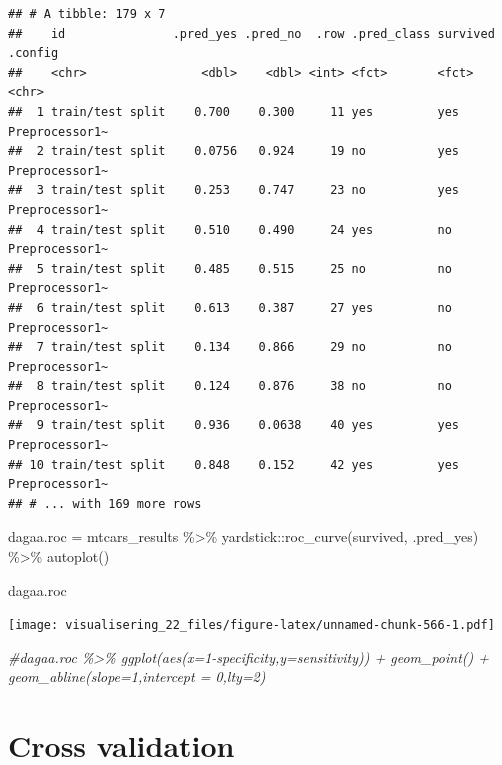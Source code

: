 \documentclass[
]{book}
\newenvironment{Shaded}{\begin{snugshade}}{\end{snugshade}}
\newcommand{\CommentTok}[1]{\textcolor[rgb]{0.56,0.35,0.01}{\textit{#1}}}
\newcommand{\FunctionTok}[1]{\textcolor[rgb]{0.00,0.00,0.00}{#1}}
\newcommand{\NormalTok}[1]{#1}
\newcommand{\OtherTok}[1]{\textcolor[rgb]{0.56,0.35,0.01}{#1}}
\newcommand{\SpecialCharTok}[1]{\textcolor[rgb]{0.00,0.00,0.00}{#1}}
\begin{document}
\begin{verbatim}
## # A tibble: 179 x 7
##    id               .pred_yes .pred_no  .row .pred_class survived .config       
##    <chr>                <dbl>    <dbl> <int> <fct>       <fct>    <chr>         
##  1 train/test split    0.700    0.300     11 yes         yes      Preprocessor1~
##  2 train/test split    0.0756   0.924     19 no          yes      Preprocessor1~
##  3 train/test split    0.253    0.747     23 no          yes      Preprocessor1~
##  4 train/test split    0.510    0.490     24 yes         no       Preprocessor1~
##  5 train/test split    0.485    0.515     25 no          no       Preprocessor1~
##  6 train/test split    0.613    0.387     27 yes         no       Preprocessor1~
##  7 train/test split    0.134    0.866     29 no          no       Preprocessor1~
##  8 train/test split    0.124    0.876     38 no          no       Preprocessor1~
##  9 train/test split    0.936    0.0638    40 yes         yes      Preprocessor1~
## 10 train/test split    0.848    0.152     42 yes         yes      Preprocessor1~
## # ... with 169 more rows
\end{verbatim}

\begin{Shaded}
\begin{Highlighting}[]
\NormalTok{dagaa.roc }\OtherTok{=}\NormalTok{ mtcars\_results }\SpecialCharTok{\%\textgreater{}\%}
\NormalTok{  yardstick}\SpecialCharTok{::}\FunctionTok{roc\_curve}\NormalTok{(survived, }
\NormalTok{                        .pred\_yes) }\SpecialCharTok{\%\textgreater{}\%} \FunctionTok{autoplot}\NormalTok{()}

\NormalTok{dagaa.roc}
\end{Highlighting}
\end{Shaded}

\texttt{[image: visualisering\_22\_files/figure-latex/unnamed-chunk-566-1.pdf]}

\begin{Shaded}
\begin{Highlighting}[]
\CommentTok{\#dagaa.roc \%\textgreater{}\% ggplot(aes(x=1{-}specificity,y=sensitivity)) + geom\_point() + geom\_abline(slope=1,intercept = 0,lty=2)}
\end{Highlighting}
\end{Shaded}

\hypertarget{cross-validation}{%
\section{Cross validation}\label{cross-validation}}
\end{document}
